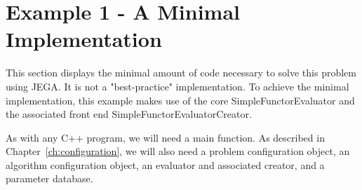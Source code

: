 \section{Example 1 - A Minimal Implementation}\label{sec:example_1}
This section displays the minimal amount of code necessary to solve
this problem using JEGA.  It is not a "best-practice"
implementation.  To achieve the minimal implementation, this example
makes use of the core SimpleFunctorEvaluator and the associated
front end SimpleFunctorEvaluatorCreator.

As with any C++ program, we will need a main function.  As described
in Chapter~\ref{ch:configuration}, we will also need a problem
configuration object, an algorithm configuration object, an
evaluator and associated creator, and a parameter database.

